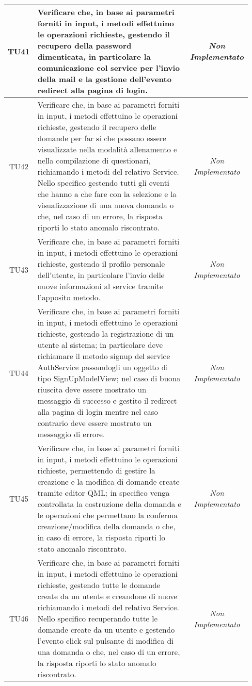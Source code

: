 \begin{longtable}{|c|>{}m{10cm}|c|}
\hypertarget{TU41}{TU41} & Verificare che, in base ai parametri forniti in input, i metodi effettuino le operazioni richieste, gestendo il recupero della password dimenticata, in particolare la comunicazione col service per l'invio della mail e la gestione dell'evento redirect alla pagina di login. & \textit{Non Implementato}\\ \hline
\hypertarget{TU42}{TU42} & Verificare che, in base ai parametri forniti in input, i metodi effettuino le operazioni richieste, gestendo il recupero delle domande per far si che possano essere visualizzate nella modalità allenamento e nella compilazione di questionari, richiamando i metodi del relativo Service. Nello specifico gestendo tutti gli eventi che hanno a che fare con la selezione e la visualizzazione di una nuova domanda o che, nel caso di un errore, la risposta riporti lo stato anomalo riscontrato. & \textit{Non Implementato}\\ \hline
\hypertarget{TU43}{TU43} & Verificare che, in base ai parametri forniti in input, i metodi effettuino le operazioni richieste, gestendo il profilo personale dell'utente, in particolare l'invio delle nuove informazioni al service tramite l'apposito metodo. & \textit{Non Implementato}\\ \hline
\hypertarget{TU44}{TU44} & Verificare che, in base ai parametri forniti in input, i metodi effettuino le operazioni richieste, gestendo la registrazione di un utente al sistema; in particolare deve richiamare il metodo signup del service AuthService passandogli un oggetto
di tipo SignUpModelView; nel caso di buona riuscita deve essere mostrato un messaggio di successo e gestito il redirect alla pagina di login mentre nel caso contrario deve essere mostrato un messaggio di errore. & \textit{Non Implementato}\\ \hline
\hypertarget{TU45}{TU45} & Verificare che, in base ai parametri forniti in input, i metodi effettuino le operazioni richieste, permettendo di gestire la creazione e la modifica di domande create tramite editor QML; in specifico venga controllata la costruzione della domanda e le operazioni che permettano la conferma creazione/modifica della domanda o che, in caso di errore, la risposta riporti lo stato anomalo riscontrato. & \textit{Non Implementato}\\ \hline
\hypertarget{TU46}{TU46} & Verificare che, in base ai parametri forniti in input, i metodi effettuino le operazioni richieste, gestendo tutte le domande create da un utente e creandone di nuove richiamando i metodi del relativo Service. Nello specifico recuperando tutte le domande create da un utente e gestendo l'evento click sul pulsante di modifica di una domanda o che, nel caso di un errore, la risposta riporti lo stato anomalo riscontrato. & \textit{Non Implementato}\\ \hline

\end{longtable}
